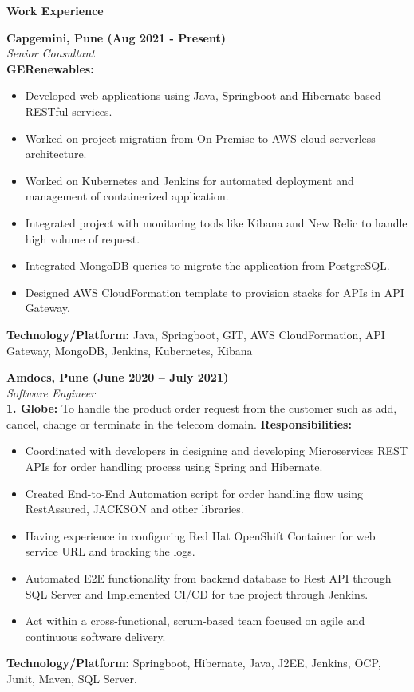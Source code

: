 \documentclass[a4paper,10pt]{article}
\begin{document}
\vspace{0.5cm}

\textbf{Work Experience}

\textbf{Capgemini, Pune (Aug 2021 - Present)} \\
\textit{Senior Consultant} \\
\textbf{GERenewables:}
\begin{itemize}
    \item Developed web applications using Java, Springboot and Hibernate based RESTful services.
    \item Worked on project migration from On-Premise to AWS cloud serverless architecture.
    \item Worked on Kubernetes and Jenkins for automated deployment and management of containerized application.
    \item Integrated project with monitoring tools like Kibana and New Relic to handle high volume of request.
    \item Integrated MongoDB queries to migrate the application from PostgreSQL.
    \item Designed AWS CloudFormation template to provision stacks for APIs in API Gateway.
\end{itemize}
\textbf{Technology/Platform:} Java, Springboot, GIT, AWS CloudFormation, API Gateway, MongoDB, Jenkins, Kubernetes, Kibana

\vspace{0.5cm}

\textbf{Amdocs, Pune (June 2020 – July 2021)} \\
\textit{Software Engineer} \\
\textbf{1. Globe:} To handle the product order request from the customer such as add, cancel, change or terminate in the telecom domain.
\textbf{Responsibilities:}
\begin{itemize}
    \item Coordinated with developers in designing and developing Microservices REST APIs for order handling process using Spring and Hibernate.
    \item Created End-to-End Automation script for order handling flow using RestAssured, JACKSON and other libraries.
    \item Having experience in configuring Red Hat OpenShift Container for web service URL and tracking the logs.
    \item Automated E2E functionality from backend database to Rest API through SQL Server and Implemented CI/CD for the project through Jenkins.
    \item Act within a cross-functional, scrum-based team focused on agile and continuous software delivery.
\end{itemize}
\textbf{Technology/Platform:} Springboot, Hibernate, Java, J2EE, Jenkins, OCP, Junit, Maven, SQL Server.
\end{document}
